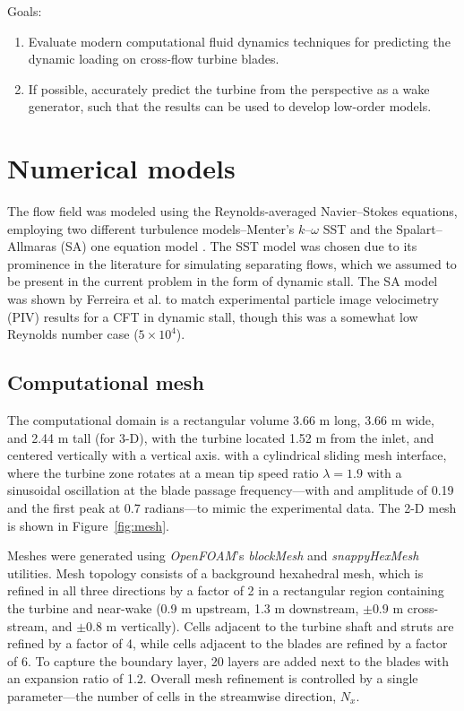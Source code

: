 \documentclass[aip,graphicx]{revtex4-1}
\begin{document}
Goals:

\begin{enumerate}

    \item Evaluate modern computational fluid dynamics techniques for predicting
    the dynamic loading on cross-flow turbine blades.

    \item If possible, accurately predict the turbine from the perspective as a
    wake generator, such that the results can be used to develop low-order
    models.

\end{enumerate}


\section{Numerical models}

The flow field was modeled using the Reynolds-averaged Navier--Stokes equations,
employing two different turbulence models--Menter's $k$--$\omega$ SST
\cite{Menter1994} and the Spalart--Allmaras (SA) one equation model
\cite{Spalart1992}. The SST model was chosen due to its prominence in the
literature for simulating separating flows, which we assumed to be present in
the current problem in the form of dynamic stall. The SA model was shown by
Ferreira et al. \cite{Ferreira2007} to match experimental particle image
velocimetry (PIV) results for a CFT in dynamic stall, though this was a somewhat
low Reynolds number case ($5 \times 10^4$).

\subsection{Computational mesh}

The computational domain is a rectangular volume 3.66 m long, 3.66 m wide, and
2.44 m tall (for 3-D), with the turbine located 1.52 m from the inlet, and
centered vertically with a vertical axis. with a cylindrical sliding mesh
interface, where the turbine zone rotates at a mean tip speed ratio
$\lambda=1.9$ with a sinusoidal oscillation at the blade passage
frequency---with and amplitude of 0.19 and the first peak at 0.7 radians---to
mimic the experimental data. The 2-D mesh is shown in Figure~\ref{fig:mesh}.

Meshes were generated using \textit{OpenFOAM}'s \textit{blockMesh} and
\textit{snappyHexMesh} utilities. Mesh topology consists of a background
hexahedral mesh, which is refined in all three directions by a factor of 2 in a
rectangular region containing the turbine and near-wake (0.9 m upstream, 1.3 m
downstream, $\pm 0.9$ m cross-stream, and $\pm 0.8$ m vertically). Cells
adjacent to the turbine shaft and struts are refined by a factor of 4, while
cells adjacent to the blades are refined by a factor of 6. To capture the
boundary layer, 20 layers are added next to the blades with an expansion ratio
of 1.2. Overall mesh refinement is controlled by a single parameter---the number
of cells in the streamwise direction, $N_x$.
\end{document}
